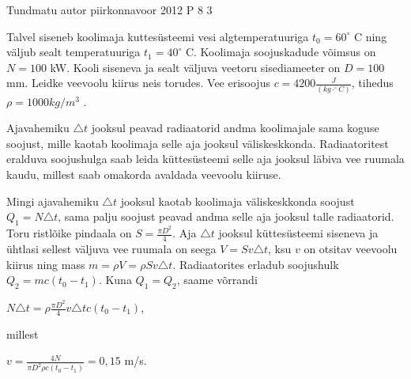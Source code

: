 {Tundmatu autor} %
{piirkonnavoor} %
{2012} %
{P 8} %
{3} %
{

\ifStatement
Talvel siseneb koolimaja kuttesüsteemi vesi algtemperatuuriga $t_0 = 60^{\circ}$ C ning väljub sealt temperatuuriga $t_1 = 40^{\circ}$ C. Koolimaja soojuskadude võimsus on $N = 100$ kW. Kooli siseneva ja sealt väljuva veetoru sisediameeter on $D = 100$ mm. Leidke veevoolu kiirus neis torudes. Vee erisoojus $c = 4200 \frac{J}{(kg \cdot ^{\circ}C)}$, tihedus $\rho = 1000 kg/m^3$ .
\fi

\ifHint
Ajavahemiku $\triangle t$ jooksul peavad radiaatorid andma koolimajale sama koguse soojust, mille kaotab koolimaja selle aja jooksul väliskeskkonda. Radiaatoritest eralduva soojushulga saab leida küttesüsteemi selle aja jooksul läbiva vee ruumala kaudu, millest saab omakorda avaldada veevoolu kiiruse.
\fi

\ifSolution
Mingi ajavahemiku $\triangle t$ jooksul kaotab koolimaja väliskeskkonda soojust $Q_1 = N \triangle t$, sama palju soojust peavad andma selle aja jooksul talle radiaatorid. Toru ristlõike pindaala on $S = \frac{\pi D^2}{4}$. Aja $\triangle t$ jooksul küttesüsteemi siseneva ja ühtlasi sellest väljuva vee ruumala on seega $V = Sv \triangle t$, ksu $v$ on otsitav veevoolu kiirus ning mass $m = \rho V = \rho S v \triangle t$. Radiaatorites erladub soojushulk $Q_2 = mc(t_0 - t_1)$. Kuna $Q_1 = Q_2$, saame võrrandi
\begin{center}
$N \triangle t = \rho \frac{\pi D^2}{4} v \triangle tc (t_0 - t_1)$,
\end{center}
millest
\begin{center}
$v = \frac{4N}{\pi D^2\rho c (t_0 - t_1)} = 0,15$ m/s.
\end{center}
\fi
}